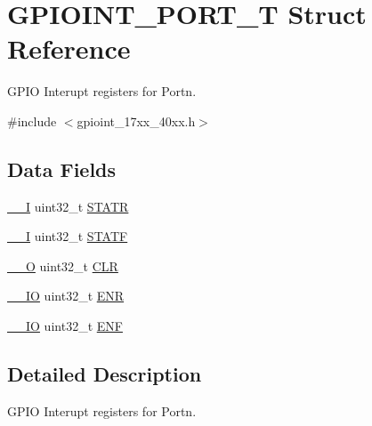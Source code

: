 \hypertarget{structGPIOINT__PORT__T}{\section{G\-P\-I\-O\-I\-N\-T\-\_\-\-P\-O\-R\-T\-\_\-\-T Struct Reference}
\label{structGPIOINT__PORT__T}
}


G\-P\-I\-O Interupt registers for Portn.  




{\ttfamily \#include $<$gpioint\-\_\-17xx\-\_\-40xx.\-h$>$}

\subsection*{Data Fields}
\begin{DoxyCompactItemize}
\item 
\hyperlink{core__cm3_8h_af63697ed9952cc71e1225efe205f6cd3}{\-\_\-\-\_\-\-I} uint32\-\_\-t \hyperlink{structGPIOINT__PORT__T_afff0c48e8b49a668e3f7125b5443280a}{S\-T\-A\-T\-R}
\item 
\hyperlink{core__cm3_8h_af63697ed9952cc71e1225efe205f6cd3}{\-\_\-\-\_\-\-I} uint32\-\_\-t \hyperlink{structGPIOINT__PORT__T_a4439b8e7ddaac1768c0caf158a884375}{S\-T\-A\-T\-F}
\item 
\hyperlink{core__cm3_8h_a7e25d9380f9ef903923964322e71f2f6}{\-\_\-\-\_\-\-O} uint32\-\_\-t \hyperlink{structGPIOINT__PORT__T_aca139ec8cd0a157793ab02b63caaa32b}{C\-L\-R}
\item 
\hyperlink{core__cm3_8h_aec43007d9998a0a0e01faede4133d6be}{\-\_\-\-\_\-\-I\-O} uint32\-\_\-t \hyperlink{structGPIOINT__PORT__T_aec2ea22900c6c655ffe5da100027c792}{E\-N\-R}
\item 
\hyperlink{core__cm3_8h_aec43007d9998a0a0e01faede4133d6be}{\-\_\-\-\_\-\-I\-O} uint32\-\_\-t \hyperlink{structGPIOINT__PORT__T_ac0330b9c737da49042c1318175e13038}{E\-N\-F}
\end{DoxyCompactItemize}


\subsection{Detailed Description}
G\-P\-I\-O Interupt registers for Portn. 

